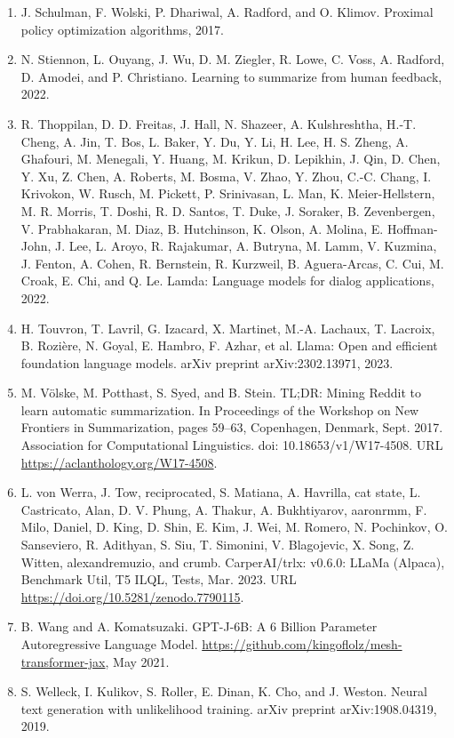 \documentclass[11pt,UTF8,fontset=fandol]{ctexart}
\begin{document}
\begin{enumerate}[leftmargin=2.2em, itemsep=2pt]
\item J. Schulman, F. Wolski, P. Dhariwal, A. Radford, and O. Klimov. Proximal policy optimization algorithms, 2017.
\item N. Stiennon, L. Ouyang, J. Wu, D. M. Ziegler, R. Lowe, C. Voss, A. Radford, D. Amodei, and P. Christiano. Learning to summarize from human feedback, 2022.
\item R. Thoppilan, D. D. Freitas, J. Hall, N. Shazeer, A. Kulshreshtha, H.-T. Cheng, A. Jin, T. Bos, L. Baker, Y. Du, Y. Li, H. Lee, H. S. Zheng, A. Ghafouri, M. Menegali, Y. Huang, M. Krikun, D. Lepikhin, J. Qin, D. Chen, Y. Xu, Z. Chen, A. Roberts, M. Bosma, V. Zhao, Y. Zhou, C.-C. Chang, I. Krivokon, W. Rusch, M. Pickett, P. Srinivasan, L. Man, K. Meier-Hellstern, M. R. Morris, T. Doshi, R. D. Santos, T. Duke, J. Soraker, B. Zevenbergen, V. Prabhakaran, M. Diaz, B. Hutchinson, K. Olson, A. Molina, E. Hoffman-John, J. Lee, L. Aroyo, R. Rajakumar, A. Butryna, M. Lamm, V. Kuzmina, J. Fenton, A. Cohen, R. Bernstein, R. Kurzweil, B. Aguera-Arcas, C. Cui, M. Croak, E. Chi, and Q. Le. Lamda: Language models for dialog applications, 2022.
\item H. Touvron, T. Lavril, G. Izacard, X. Martinet, M.-A. Lachaux, T. Lacroix, B. Rozi\`ere, N. Goyal, E. Hambro, F. Azhar, et al. Llama: Open and efficient foundation language models. arXiv preprint arXiv:2302.13971, 2023.
\item M. V\"olske, M. Potthast, S. Syed, and B. Stein. TL;DR: Mining Reddit to learn automatic summarization. In Proceedings of the Workshop on New Frontiers in Summarization, pages 59--63, Copenhagen, Denmark, Sept. 2017. Association for Computational Linguistics. doi: 10.18653/v1/W17-4508. URL \url{https://aclanthology.org/W17-4508}.
\item L. von Werra, J. Tow, reciprocated, S. Matiana, A. Havrilla, cat state, L. Castricato, Alan, D. V. Phung, A. Thakur, A. Bukhtiyarov, aaronrmm, F. Milo, Daniel, D. King, D. Shin, E. Kim, J. Wei, M. Romero, N. Pochinkov, O. Sanseviero, R. Adithyan, S. Siu, T. Simonini, V. Blagojevic, X. Song, Z. Witten, alexandremuzio, and crumb. CarperAI/trlx: v0.6.0: LLaMa (Alpaca), Benchmark Util, T5 ILQL, Tests, Mar. 2023. URL \url{https://doi.org/10.5281/zenodo.7790115}.
\item B. Wang and A. Komatsuzaki. GPT-J-6B: A 6 Billion Parameter Autoregressive Language Model. \url{https://github.com/kingoflolz/mesh-transformer-jax}, May 2021.
\item S. Welleck, I. Kulikov, S. Roller, E. Dinan, K. Cho, and J. Weston. Neural text generation with unlikelihood training. arXiv preprint arXiv:1908.04319, 2019.

\end{enumerate}
\end{document}
